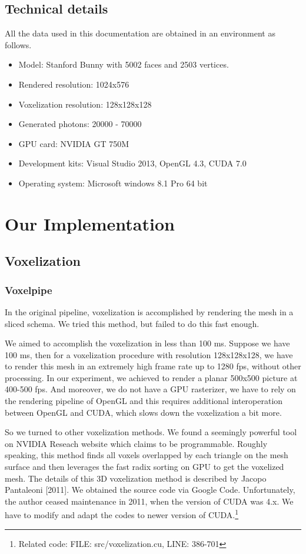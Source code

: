 \documentclass[a4paper]{article}
\begin{document}
\begin{CJK*}{UTF8}{gkai}
\begin{enumerate}
\end{enumerate}


\subsection{Technical details}
All the data used in this documentation are obtained in an environment as follows.
\begin{itemize}
\item Model: Stanford Bunny with 5002 faces and 2503 vertices.
\item Rendered resolution: 1024x576
\item Voxelization resolution: 128x128x128
\item Generated photons: 20000 - 70000
\item GPU card: NVIDIA GT 750M
\item Development kits: Visual Studio 2013, OpenGL 4.3, CUDA 7.0
\item Operating system: Microsoft windows 8.1 Pro 64 bit
\end{itemize}


\section{Our Implementation}
\subsection{Voxelization}
\subsubsection{Voxelpipe}

In the original pipeline, voxelization is accomplished by rendering the mesh in a sliced schema. We tried this method,  but failed to do this fast enough. 

We aimed to accomplish the voxelization in less than 100 ms. Suppose we have 100 ms, then for a voxelization procedure with resolution 128x128x128, we have to render this mesh in an extremely high frame rate up to 1280 fps, without other processing. In our experiment, we achieved to render a planar 500x500 picture at 400-500 fps. And moreover, we do not have a GPU rasterizer, we have to rely on the rendering pipeline of OpenGL and this requires additional interoperation between OpenGL and CUDA, which slows down the voxelization a bit more.

So we turned to other voxelization methods. We found a seemingly powerful tool on NVIDIA Reseach website which claims to be programmable. Roughly speaking, this method finds all voxels overlapped by each triangle on the mesh surface and then leverages the fast radix sorting on GPU to get the voxelized mesh. The details of this 3D voxelization method is described by Jacopo Pantaleoni [2011].\cite{citation:voxelpipe} We obtained the source code via Google Code. Unfortunately, the author ceased maintenance in 2011, when the version of CUDA was 4.x. We have to modify and adapt the codes to newer version of CUDA.\footnote{Related code: FILE: src/voxelization.cu, LINE: 386-701}


\end{CJK*}
\end{document}
